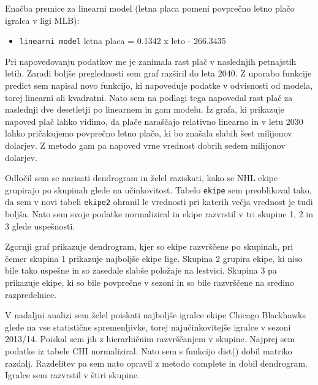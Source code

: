 \documentclass[11pt,a4paper]{article}
\begin{document}
Enačba premice za linearni model (letna placa pomeni povprečno letno plačo igralca v ligi MLB):
\begin{itemize}
\item{\verb|linearni model| letna placa = 0.1342 x leto - 266.3435}
\end{itemize}


Pri napovedovanju podatkov me je zanimala rast plač v naslednjih petnajstih letih. Zaradi boljše preglednosti sem graf razširil do leta 2040. Z uporabo funkcije predict sem napisal novo funkcijo, ki napoveduje podatke v odvisnosti od modela, torej linearni ali kvadratni. Nato sem na podlagi tega napovedal rast plač za naslednji dve desetletji po linearnem  in gam modelu. Iz grafa, ki prikazuje napoved plač lahko vidimo, da plače naraščajo relativno linearno in v letu 2030 lahko pričakujemo povprečno letno plačo, ki bo znašala slabih šest milijonov dolarjev. Z metodo gam pa napoved vrne vrednost dobrih sedem milijonov dolarjev.

 
Odločil sem se narisati dendrogram in želel raziskati, kako se NHL ekipe grupirajo po skupinah glede na učinkovitost. Tabelo \verb|ekipe| sem preoblikoval tako, da sem v novi tabeli \verb|ekipe2| ohranil le vrednosti pri katerih večja vrednost je tudi boljša. Nato sem svoje podatke normaliziral in ekipe razvrstil v tri skupine 1, 2 in 3 glede uspešnosti.


Zgornji graf prikazuje dendrogram, kjer so ekipe razvrščene po skupinah, pri čemer skupina 1 prikazuje najboljše ekipe lige. Skupina 2 grupira ekipe, ki niso bile tako uspešne in so zasedale slabše položaje na lestvici. Skupina 3 pa prikazuje ekipe, ki so bile povprečne v sezoni in so bile razvrščene na sredino razpredelnice.

V nadaljni analizi sem želel poiskati najboljše igralce ekipe Chicago Blackhawks glede na vse statistične spremenljivke, torej najučinkovitejše igralce v sezoni 2013/14. Poiskal sem jih z hierarhičnim razvrščanjem v skupine. Najprej sem podatke iz tabele CHI normaliziral. Nato sem s funkcijo dist() dobil matriko razdalj. Razdelitev pa sem nato opravil z metodo complete in dobil dendrogram. Igralce sem razvrstil v štiri skupine.

\end{document}

